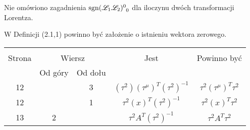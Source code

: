 \documentclass[a4paper,11pt]{article}
\begin{document}
\vspace{\spaceTwo}


















\vspace{\spaceFour}



\noindent
{} Nie omówiono zagadnienia
$\sgn\tensor{ ( \Lcal_{ 1 } \Lcal_{ 2 } ) }{^{ 0 }_{ 0 }}$ dla iloczynu dwóch
transformacji Lorentza.

\vspace{\spaceFour}





\noindent
{} W Definicji (2.1,1) powinno być założenie o istnieniu
wektora zerowego.







\begin{center}

  \begin{tabular}{|c|c|c|c|c|}
    \hline
    & \multicolumn{2}{c|}{} & & \\
    Strona & \multicolumn{2}{c|}{Wiersz} & Jest
                              & Powinno być \\ \cline{2-3}
    & Od góry & Od dołu & & \\
    \hline
    12 & &  3 & $( \tau^{ 2 } )( \tau^{ \mu } )^{ T }( \tau^{ 2 } )^{ -1 }$
           & $\tau^{ 2 } ( \tau^{ \mu } )^{ T } \tau^{ 2 }$ \\
    12 & & 1 & $\tau^{ 2 } ( x )^{ T }( \tau^{ 2 } )^{ -1 }$
           & $\tau^{ 2 } ( x )^{ T } \tau^{ 2 }$ \\ %
    13 & 2 & & $\tau^{ 2 } A^{ T }( \tau^{ 2 } )^{ -1 }$
           & $\tau^{ 2 } A^{ T } \tau^{ 2 }$ \\
    \hline
  \end{tabular}

\end{center}
\end{document}

